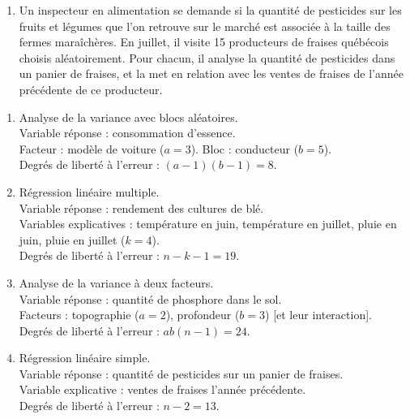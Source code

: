 \begin{exercice}
\begin{enumerate}[label=(\alph*)]
\begin{itemize}
    \item les 30 mesures de phosphore décrites ci-dessus seront prises dans un ordre
    aléatoire.
  \end{itemize}
  \item Un inspecteur en alimentation se demande si la quantité de pesticides sur les fruits
  et légumes que l'on retrouve sur le marché est associée à la taille des fermes
  maraîchères. En juillet, il visite 15 producteurs de fraises québécois choisis
  aléatoirement. Pour chacun, il analyse la quantité de pesticides dans un panier de
  fraises, et la met en relation avec les ventes de fraises de l'année précédente de ce
  producteur.
\end{enumerate}
\begin{solution}
\begin{enumerate}[label=(\alph*)]
  \item Analyse de la variance avec blocs aléatoires.\\
  Variable réponse : consommation d'essence.\\
  Facteur : modèle de voiture ($a=3$). Bloc : conducteur ($b=5$).\\
  Degrés de liberté à l'erreur : $(a-1)(b-1)=8$.
  \item Régression linéaire multiple.\\
  Variable réponse : rendement des cultures de blé.\\
  Variables explicatives : température en juin, température en juillet, pluie en juin,
  pluie en juillet ($k=4$).\\
  Degrés de liberté à l'erreur : $n-k-1=19$.
  \item Analyse de la variance à deux facteurs.\\
  Variable réponse : quantité de phosphore dans le sol.\\
  Facteurs : topographie ($a=2$), profondeur ($b=3$) [et leur interaction].\\
  Degrés de liberté à l'erreur : $ab(n-1)=24$.
  \item Régression linéaire simple.\\
  Variable réponse : quantité de pesticides sur un panier de fraises.\\
  Variable explicative : ventes de fraises l'année précédente.\\
  Degrés de liberté à l'erreur : $n-2=13$.
\end{enumerate}
\end{solution}
\end{exercice}

